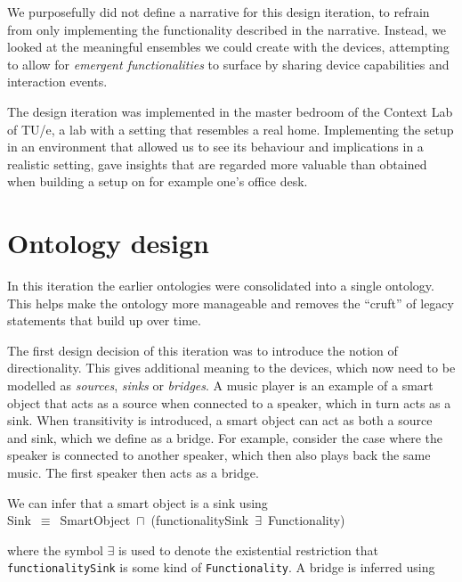 We purposefully did not define a narrative for this design iteration, to refrain from only implementing the functionality described in the narrative. Instead, we looked at the meaningful ensembles we could create with the devices, attempting to allow for \emph{emergent functionalities} to surface by sharing device capabilities and interaction events.

The design iteration was implemented in the master bedroom of the Context Lab of TU/e, a lab with a setting that resembles a real home. Implementing the setup in an environment that allowed us to see its behaviour and implications in a realistic setting, gave insights that are regarded more valuable than obtained when building a setup on for example one's office desk. 


\section{Ontology design}
\label{OntologyDesign3}

In this iteration the earlier ontologies were consolidated into a single ontology. This helps make the ontology more manageable and removes the ``cruft'' of legacy statements that build up over time. 

The first design decision of this iteration was to introduce the notion of directionality. This gives additional meaning to the devices, which now need to be modelled as \emph{sources}, \emph{sinks} or \emph{bridges}. A music player is an example of a smart object that acts as a source when connected to a speaker, which in turn acts as a sink. When transitivity is introduced, a smart object can act as both a source and sink, which we define as a bridge. For example, consider the case where the speaker is connected to another speaker, which then also plays back the same music. The first speaker then acts as a bridge.

We can infer that a smart object is a sink using\\

\noindent Sink~\ensuremath{\equiv}~SmartObject~\ensuremath{\sqcap}~(functionalitySink~\ensuremath{\exists}~Functionality)\\ 

where the symbol \ensuremath{\exists} is used to denote the existential restriction that \texttt{functionalitySink} is some kind of \texttt{Functionality}. A bridge is inferred using\\

